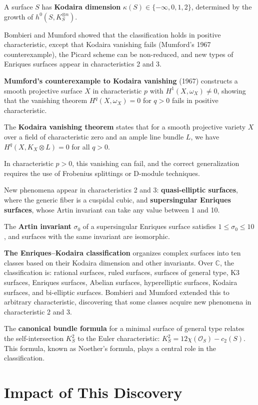 A surface $S$ has \textbf{Kodaira dimension} $\kappa(S) \in \{-\infty, 0, 1, 2\}$, determined by the growth of $h^0(S, K_S^{\otimes n})$.

Bombieri and Mumford showed that the classification holds in positive characteristic, except that Kodaira vanishing fails (Mumford's 1967 counterexample), the Picard scheme can be non-reduced, and new types of Enriques surfaces appear in characteristics 2 and 3.

\textbf{Mumford's counterexample to Kodaira vanishing} (1967) constructs a smooth projective surface $X$ in characteristic $p$ with $H^1(X, \omega_X) \neq 0$, showing that the vanishing theorem $H^q(X, \omega_X) = 0$ for $q > 0$ fails in positive characteristic.

The \textbf{Kodaira vanishing theorem} states that for a smooth projective variety $X$ over a field of characteristic zero and an ample line bundle $L$, we have $H^q(X, K_X \otimes L) = 0$ for all $q > 0$.

In characteristic $p > 0$, this vanishing can fail, and the correct generalization requires the use of Frobenius splittings or D-module techniques.

New phenomena appear in characteristics 2 and 3: \textbf{quasi-elliptic surfaces}, where the generic fiber is a cuspidal cubic, and \textbf{supersingular Enriques surfaces}, whose Artin invariant can take any value between 1 and 10.

The \textbf{Artin invariant} $\sigma_0$ of a supersingular Enriques surface satisfies $1 \leq \sigma_0 \leq 10$, and surfaces with the same invariant are isomorphic.

\textbf{The Enriques--Kodaira classification} organizes complex surfaces into ten classes based on their Kodaira dimension and other invariants. Over $\mathbb{C}$, the classification is: rational surfaces, ruled surfaces, surfaces of general type, K3 surfaces, Enriques surfaces, Abelian surfaces, hyperelliptic surfaces, Kodaira surfaces, and bi-elliptic surfaces. Bombieri and Mumford extended this to arbitrary characteristic, discovering that some classes acquire new phenomena in characteristic 2 and 3.

The \textbf{canonical bundle formula} for a minimal surface of general type relates the self-intersection $K_S^2$ to the Euler characteristic: $K_S^2 = 12\chi(\mathcal{O}_S) - c_2(S)$. This formula, known as Noether's formula, plays a central role in the classification.

\section{Impact of This Discovery}

